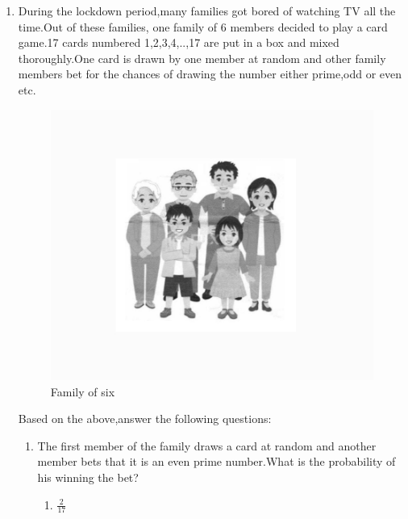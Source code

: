 
\begin{enumerate}
\item During the lockdown period,many families got bored of watching TV all the time.Out of these families, one family of 6 members decided to play a card game.17 cards numbered 1,2,3,4,..,17 are put in a box and mixed thoroughly.One card is drawn by one member at random and other family members bet for the chances of drawing the number either prime,odd or even etc.
\begin{figure}[H]
\centering
	\includegraphics[width=\columnwidth]{figs/satish.jpg}                                                                                              
\caption{Family of six}
\label{fig:satish.jpg}                                                                                                                      \end{figure}
Based on the above,answer the following questions:
\begin{enumerate}                                                                                                                                       \item The first member of the family draws a card at random and another member bets that it is an even prime number.What is the probability of his winning the bet?                                                                                                                           \begin{enumerate}
        \item $\frac{2}{17}$

\end{enumerate}
\end{enumerate}
\end{enumerate}
